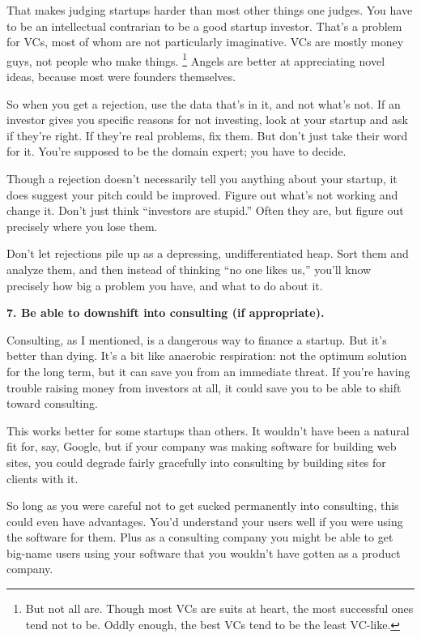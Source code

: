 That makes judging startups harder than most other things one judges.
You have to be an intellectual contrarian to be a good startup investor.
That's a problem for VCs, most of whom are not particularly imaginative.
VCs are mostly money guys, not people who make things.
\footnote{But not all are. Though most VCs are suits at heart, the most
successful ones tend not to be. Oddly enough, the best VCs tend to be
the least VC-like.} Angels are better at appreciating novel ideas,
because most were founders themselves.

So when you get a rejection, use the data that's in it, and not what's
not. If an investor gives you specific reasons for not investing, look
at your startup and ask if they're right. If they're real problems, fix
them. But don't just take their word for it. You're supposed to be the
domain expert; you have to decide.

Though a rejection doesn't necessarily tell you anything about your
startup, it does suggest your pitch could be improved. Figure out what's
not working and change it. Don't just think ``investors are stupid.''
Often they are, but figure out precisely where you lose them.

Don't let rejections pile up as a depressing, undifferentiated heap.
Sort them and analyze them, and then instead of thinking ``no one likes
us,'' you'll know precisely how big a problem you have, and what to do
about it.

\textbf{7. Be able to downshift into consulting (if appropriate).}

Consulting, as I mentioned, is a dangerous way to finance a startup. But
it's better than dying. It's a bit like anaerobic respiration: not the
optimum solution for the long term, but it can save you from an
immediate threat. If you're having trouble raising money from investors
at all, it could save you to be able to shift toward consulting.

This works better for some startups than others. It wouldn't have been a
natural fit for, say, Google, but if your company was making software
for building web sites, you could degrade fairly gracefully into
consulting by building sites for clients with it.

So long as you were careful not to get sucked permanently into
consulting, this could even have advantages. You'd understand your users
well if you were using the software for them. Plus as a consulting
company you might be able to get big-name users using your software that
you wouldn't have gotten as a product company.

